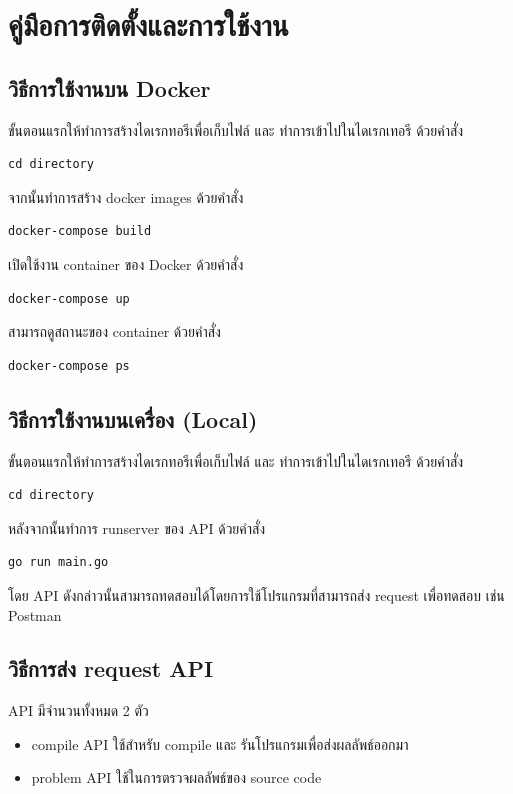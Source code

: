 \chapter{คู่มือการติดตั้งและการใช้งาน}
\label{appA}
\section{วิธีการใช้งานบน Docker}
\raggedright ขั้นตอนแรกให้ทําการสร้างไดเรกทอรีเพื่อเก็บไฟล์ และ ทำการเข้าไปในไดเรกเทอรี ด้วยคำสั่ง
\begin{lstlisting}
cd directory
\end{lstlisting}
จากนั้นทำการสร้าง docker images ด้วยคำสั่ง 
\begin{lstlisting}
docker-compose build
\end{lstlisting}
เปิดใช้งาน container ของ Docker ด้วยคําสั่ง
\begin{lstlisting}
docker-compose up
\end{lstlisting}
สามารถดูสถานะของ container ด้วยคำสั่ง
\begin{lstlisting}
docker-compose ps
\end{lstlisting}

\section{วิธีการใช้งานบนเครื่อง (Local)}

\raggedright ขั้นตอนแรกให้ทําการสร้างไดเรกทอรีเพื่อเก็บไฟล์ และ ทำการเข้าไปในไดเรกเทอรี ด้วยคำสั่ง
\begin{lstlisting}
cd directory
\end{lstlisting}
หลังจากนั้นทำการ runserver ของ API ด้วยคำสั่ง 
\begin{lstlisting}
go run main.go
\end{lstlisting}

โดย API ดังกล่าวนั้นสามารถทดสอบได้โดยการใช้โปรแกรมที่สามารถส่ง request เพื่อทดสอบ เช่น Postman

\section{วิธีการส่ง request API}
\raggedright API มีจํานวนทั้งหมด 2 ตัว

\begin{itemize}[\textbullet]
    \item compile API ใช้สำหรับ compile และ รันโปรแกรมเพื่อส่งผลลัพธ์ออกมา
    \item problem API ใช้ในการตรวจผลลัพธ์ของ source code
\end{itemize}

